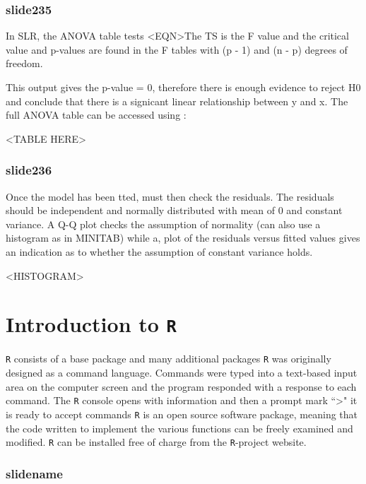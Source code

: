 \documentclass[a4paper,12pt]{article}
\begin{document}
\begin{itemize}
\begin{itemize}
		
		\subsubsection{slide235}
		
		In SLR, the ANOVA table tests <EQN>The TS is the F value and the critical value and p-values are found
		in the F tables with (p - 1) and (n - p) degrees of freedom.
		
		This output gives the p-value = 0, therefore there is enough evidence to reject H0 and conclude that there is a signicant linear relationship between y and x. The full ANOVA table can be accessed using :
		
		<TABLE HERE>
		
		
		
		\subsubsection{slide236}
		Once the model has been tted, must then check the residuals.
		The residuals should be independent and normally distributed with
		mean of 0 and constant variance.
		A Q-Q plot checks the assumption of normality (can also use a
		histogram as in MINITAB) while a, plot of the residuals versus fitted values gives an indication as to whether the assumption of constant variance holds.
		
		<HISTOGRAM>
		
		
		
		
		\section{Introduction to \texttt{R}}
		\texttt{R} consists of a base package and many additional packages
		\texttt{R} was originally designed as a command language.  
		Commands were typed into a text-based input area on the computer screen and the program responded with a response to each command.
		The \texttt{R} console opens with information and then a prompt mark  ``>"  it is ready to accept commands
		\texttt{R}  is an open source software package, meaning that the code written to implement the various functions can be freely examined and modified.
		\texttt{R} can be installed free of charge from the \texttt{R}-project website.
		
		\subsubsection{slidename}
		

\end{itemize}
\end{itemize}
\end{document}
